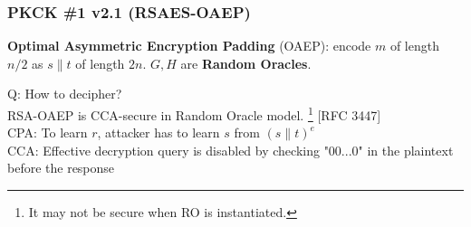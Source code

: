 \begin{comment}
\begin{frame}\frametitle{PKCS \#1 v1.5 (RSAES-PKCS1-v1\_5)}
\textbf{Public-Key Cryptography Standard (PKCS) \#1 version 1.5}:
\begin{itemize}
\item $N$ has $k$ bytes, $2^{8(k-1)} \le N < 2^{8k}$.
\item Message $m$ has $D (\le k-11)$ bytes.
\item Random pad $r$ has $(k-D-3)$ bytes without $\{0\}^8$.
\item The ciphertext:
\end{itemize}
\[[(\{0\}^8\|\{0\}^610\|r\|\{0\}^8\|m)^e \bmod N]\] 
\textbf{Security}: PKCS \#1 v1.5 is believed to be CPA-secure, although no proof based on the RSA assumption has ever been shown.
\end{frame}
\begin{frame}\frametitle{Attack on PKCS \#1 v1.5}
\textbf{PKCS \#1 v1.5 used in HTTPS}:\\
if the first 16 bits of message is not ``02'' which is standing for ``PKCK \#1'', then the web server returns error.\newline

\textbf{CCA to infer the message $m$ of ciphertext $c$}:
\begin{enumerate}
\item choose a string $r$, compute $c' \gets r^e\cdot c = (r\cdot \mathsf{PKCS1}(m))^e$.
\item send $c'$ to the web server. If the server does not return error, some bits of $m$ can be learned.
\item change $r$ and learn other bits of $m$.
\end{enumerate}

\textbf{HTTPS Defense} [RFC 5246]: if not ``02'', set the message as a random string.
\end{frame}
\end{comment}

\begin{frame}\frametitle{PKCK \#1 v2.1 (RSAES-OAEP)}
\textbf{Optimal Asymmetric Encryption Padding} (OAEP): encode $m$ of length $n/2$ as $s\| t$ of length $2n$. $G, H$ are \textbf{Random Oracles}.
\begin{figure}
\begin{center}

\end{center}
\end{figure}
\alert{Q: How to decipher?}\\
RSA-OAEP is CCA-secure in Random Oracle model. \footnote{It may not be secure when RO is instantiated.} [RFC 3447] \\
CPA: To learn $r$, attacker has to learn $s$ from $(s\| t)^e$\\
CCA: Effective decryption query is disabled by checking "00...0" in the plaintext before the response\\
\end{frame}

